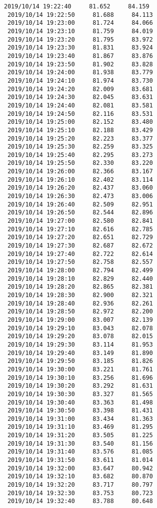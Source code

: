 \documentclass[11pt]{article}
\begin{document}
\begin{Verbatim}[commandchars=\\\{\}]
 2019/10/14 19:22:40     81.652     84.159
 2019/10/14 19:22:50     81.688     84.113
 2019/10/14 19:23:00     81.724     84.066
 2019/10/14 19:23:10     81.759     84.019
 2019/10/14 19:23:20     81.795     83.972
 2019/10/14 19:23:30     81.831     83.924
 2019/10/14 19:23:40     81.867     83.876
 2019/10/14 19:23:50     81.902     83.828
 2019/10/14 19:24:00     81.938     83.779
 2019/10/14 19:24:10     81.974     83.730
 2019/10/14 19:24:20     82.009     83.681
 2019/10/14 19:24:30     82.045     83.631
 2019/10/14 19:24:40     82.081     83.581
 2019/10/14 19:24:50     82.116     83.531
 2019/10/14 19:25:00     82.152     83.480
 2019/10/14 19:25:10     82.188     83.429
 2019/10/14 19:25:20     82.223     83.377
 2019/10/14 19:25:30     82.259     83.325
 2019/10/14 19:25:40     82.295     83.273
 2019/10/14 19:25:50     82.330     83.220
 2019/10/14 19:26:00     82.366     83.167
 2019/10/14 19:26:10     82.402     83.114
 2019/10/14 19:26:20     82.437     83.060
 2019/10/14 19:26:30     82.473     83.006
 2019/10/14 19:26:40     82.509     82.951
 2019/10/14 19:26:50     82.544     82.896
 2019/10/14 19:27:00     82.580     82.841
 2019/10/14 19:27:10     82.616     82.785
 2019/10/14 19:27:20     82.651     82.729
 2019/10/14 19:27:30     82.687     82.672
 2019/10/14 19:27:40     82.722     82.614
 2019/10/14 19:27:50     82.758     82.557
 2019/10/14 19:28:00     82.794     82.499
 2019/10/14 19:28:10     82.829     82.440
 2019/10/14 19:28:20     82.865     82.381
 2019/10/14 19:28:30     82.900     82.321
 2019/10/14 19:28:40     82.936     82.261
 2019/10/14 19:28:50     82.972     82.200
 2019/10/14 19:29:00     83.007     82.139
 2019/10/14 19:29:10     83.043     82.078
 2019/10/14 19:29:20     83.078     82.015
 2019/10/14 19:29:30     83.114     81.953
 2019/10/14 19:29:40     83.149     81.890
 2019/10/14 19:29:50     83.185     81.826
 2019/10/14 19:30:00     83.221     81.761
 2019/10/14 19:30:10     83.256     81.696
 2019/10/14 19:30:20     83.292     81.631
 2019/10/14 19:30:30     83.327     81.565
 2019/10/14 19:30:40     83.363     81.498
 2019/10/14 19:30:50     83.398     81.431
 2019/10/14 19:31:00     83.434     81.363
 2019/10/14 19:31:10     83.469     81.295
 2019/10/14 19:31:20     83.505     81.225
 2019/10/14 19:31:30     83.540     81.156
 2019/10/14 19:31:40     83.576     81.085
 2019/10/14 19:31:50     83.611     81.014
 2019/10/14 19:32:00     83.647     80.942
 2019/10/14 19:32:10     83.682     80.870
 2019/10/14 19:32:20     83.717     80.797
 2019/10/14 19:32:30     83.753     80.723
 2019/10/14 19:32:40     83.788     80.648

\end{Verbatim}
\end{document}
